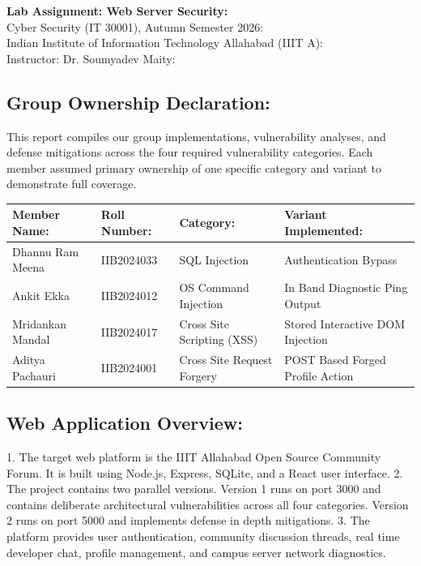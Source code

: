 \documentclass[11pt,a4paper]{article}
\begin{document}
\begin{center}
  {\Large\bfseries Lab Assignment: Web Server Security:}\\[4pt]
  {\normalsize Cyber Security (IT 30001), Autumn Semester 2026:}\\[2pt]
  {\normalsize Indian Institute of Information Technology Allahabad (IIIT A):}\\[2pt]
  {\normalsize Instructor: Dr. Soumyadev Maity:}\\[8pt]
\end{center}

\subsection*{Group Ownership Declaration:}
This report compiles our group implementations, vulnerability analyses, and defense mitigations across the four required vulnerability categories. Each member assumed primary ownership of one specific category and variant to demonstrate full coverage.

\vspace{4pt}
\noindent
\begin{tabular}{|p{3.4cm}|p{2.5cm}|p{4.4cm}|p{5.1cm}|}
\hline
\textbf{Member Name:} & \textbf{Roll Number:} & \textbf{Category:} & \textbf{Variant Implemented:} \\
\hline
Dhannu Ram Meena & IIB2024033 & SQL Injection & Authentication Bypass \\
\hline
Ankit Ekka & IIB2024012 & OS Command Injection & In Band Diagnostic Ping Output \\
\hline
Mridankan Mandal & IIB2024017 & Cross Site Scripting (XSS) & Stored Interactive DOM Injection \\
\hline
Aditya Pachauri & IIB2024001 & Cross Site Request Forgery & POST Based Forged Profile Action \\
\hline
\end{tabular}

\vspace{10pt}
\subsection*{Web Application Overview:}
1. The target web platform is the IIIT Allahabad Open Source Community Forum. It is built using Node.js, Express, SQLite, and a React user interface.
2. The project contains two parallel versions. Version 1 runs on port 3000 and contains deliberate architectural vulnerabilities across all four categories. Version 2 runs on port 5000 and implements defense in depth mitigations.
3. The platform provides user authentication, community discussion threads, real time developer chat, profile management, and campus server network diagnostics.
\end{document}

